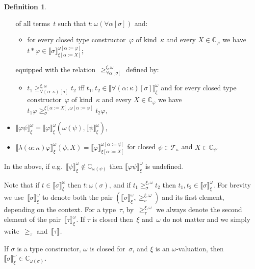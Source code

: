 \documentclass[a4paper,UKenglish,cleveref,autoref,numberwithinsect]{lipics-v2019}
\theoremstyle{definition}
\newtheorem{defn}[theorem]{Definition}
\newcommand{\tapp}[2]{#1 * #2}
\newcommand{\subst}[2]{#1:=#2}
\newcommand{\Tc}{\mathcal{T}}
\newcommand{\Cb}{\mathbb{C}}
\newcommand{\val}[3]{\ensuremath{\llbracket#1\rrbracket_{#2}^{#3}}}
\newcommand{\gteq}[3]{\ensuremath{\ge_{#1}^{#2,#3}}}
\begin{document}
\begin{defn}
\begin{itemize}
    of all terms~$t$ such that $t : \omega(\forall\alpha[\sigma])$ and:
    \begin{itemize}
    \item for every closed type constructor~$\varphi$ of kind~$\kappa$
      and every $X \in \Cb_\varphi$ we have $\tapp{t}{\varphi} \in
      \val{\sigma}{\xi[\subst{\alpha}{X}]}{\omega[\subst{\alpha}{\varphi}]}$;
    \end{itemize}
    equipped with the
    relation~$\gteq{\forall\alpha[\sigma]}{\xi}{\omega}$ defined by:
    \begin{itemize}
    \item $t_1 \gteq{\forall(\alpha:\kappa)[\sigma]}{\xi}{\omega} t_2$
      iff $t_1,t_2 \in
      \val{\forall(\alpha:\kappa)[\sigma]}{\xi}{\omega}$ and for every
      closed type constructor~$\varphi$ of kind~$\kappa$ and every $X
      \in \Cb_\varphi$ we have $t_1 \varphi
      \gteq{\sigma}{\xi[\subst{\alpha}{X}]}{\omega[\subst{\alpha}{\varphi}]}
      t_2 \varphi$,
    \end{itemize}
  \item
    $\val{\varphi \psi}{\xi}{\omega} =
    \val{\varphi}{\xi}{\omega}(\omega(\psi),\val{\psi}{\xi}{\omega})$,
  \item
    $\val{\lambda(\alpha:\kappa)\varphi}{\xi}{\omega}(\psi,X) =
    \val{\varphi}{\xi[\subst{\alpha}{X}]}{\omega[\subst{\alpha}{\psi}]}$
    for closed $\psi \in \Tc_\kappa$ and $X \in \Cb_\psi$.
  \end{itemize}
  In the above, if e.g.~$\val{\psi}{\xi}{\omega} \notin
  \Cb_{\omega(\psi)}$ then $\val{\varphi \psi}{\xi}{\omega}$ is
  undefined.
\end{defn}

Note that if $t \in \val{\sigma}{\xi}{\omega}$ then $t :
\omega(\sigma)$, and if $t_1 \gteq{\sigma}{\xi}{\omega} t_2$ then
$t_1,t_2\in\val{\sigma}{\xi}{\omega}$. For brevity we
use~$\val{\sigma}{\xi}{\omega}$ to denote both the pair
$(\val{\sigma}{\xi}{\omega},{\gteq{\sigma}{\xi}{\omega}})$ and its
first element, depending on the context. For a type~$\tau$,
by~$\gteq{\tau}{\xi}{\omega}$ we always denote the second element of
the pair~$\val{\tau}{\xi}{\omega}$. If $\tau$ is closed then~$\xi$
and~$\omega$ do not matter and we simply write~$\geq_\tau$
and~$\val{\tau}{}{}$.

\begin{lemma}\label{lem_val_wm_computable}
  If $\sigma$ is a type constructor, $\omega$ is closed for~$\sigma$,
  and $\xi$ is an $\omega$-valuation, then $\val{\sigma}{\xi}{\omega}
  \in \Cb_{\omega(\sigma)}$.
\end{lemma}
\end{document}
